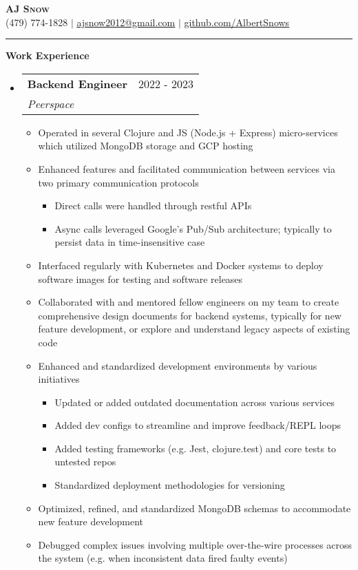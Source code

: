 \documentclass[letterpaper,11pt]{article}
\makeatletter
\newcommand{\resumeItem}[1]{
  \item\small{
    {#1 \vspace{-2pt}}
  }
}
\newcommand{\resumeSubheading}[4]{
  \vspace{-2pt}\item
    \begin{tabular*}{0.97\textwidth}[t]{l@{\extracolsep{\fill}}r}
      \textbf{#1} & #2 \\
      \textit{\small#3} & \textit{\small #4} \\
    \end{tabular*}\vspace{0pt}
}
\newcommand{\resumeSubHeadingListStart}{\begin{itemize}[leftmargin=0.15cm, label={}]}
\newcommand{\resumeSubHeadingListEnd}{\end{itemize}}
\newcommand{\resumeItemListStart}{\begin{itemize}}
\newcommand{\resumeItemListEnd}{\end{itemize}\vspace{-5pt}}
\makeatother
\begin{document}
\textbf{\scshape \Large AJ Snow} \\ \vspace{3pt}
\small (479) 774-1828 $|$ \href{mailto:ajsnow2012@gmail.com}
{\underline{ajsnow2012@gmail.com}} $|$ 
\href{https://github.com/AlbertSnows}{\underline{github.com/AlbertSnows}}
\noindent\rule{19.5cm}{0.4pt}

\textbf{\large Work Experience}
\resumeSubHeadingListStart
    \resumeSubheading
      {Backend Engineer}{2022 - 2023}
      {Peerspace}{}
      \resumeItemListStart
        \resumeItem{Operated in several Clojure and JS (Node.js + Express) micro-services which utilized MongoDB storage and GCP hosting}
        \resumeItem{Enhanced features and facilitated communication between services via two primary communication protocols}
            \begin{itemize}
                \item Direct calls were handled through restful APIs
                \item Async calls leveraged Google's Pub/Sub architecture; typically to persist data in time-insensitive case
            \end{itemize}
        \resumeItem{Interfaced regularly with Kubernetes and Docker systems to deploy software images for testing and software releases}
        \resumeItem{Collaborated with and mentored fellow engineers on my team to create comprehensive design documents for backend systems,  typically for new feature development, or explore and understand legacy aspects of existing code}
        \resumeItem{Enhanced and standardized development environments by various initiatives}
        \begin{itemize}
            \item Updated or added outdated documentation across various services
            \item Added dev configs to streamline and improve feedback/REPL loops
            \item Added testing frameworks (e.g. Jest, clojure.test) and core tests to untested repos 
            \item Standardized deployment methodologies for versioning
        \end{itemize}
        \resumeItem{Optimized, refined, and standardized MongoDB schemas to accommodate new feature development}
        \resumeItem{Debugged complex issues involving multiple over-the-wire processes across the system (e.g. when inconsistent data fired faulty events) }
        \resumeItemListEnd
    \resumeSubHeadingListEnd
\end{document}
